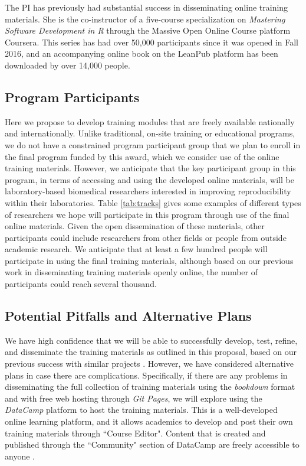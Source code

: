 \documentclass[pdftex,english,11.5pt,parskip=half]{scrartcl}
\begin{document}
The PI has previously had substantial success in disseminating online training materials. She is the co-instructor of a five-course specialization on \textit{Mastering Software Development in R} through the Massive Open Online Course platform Coursera. This series has had over 50,000 participants since it was opened in Fall 2016, and an accompanying online book on the LeanPub platform has been downloaded by over 14,000 people.

\subsection{Program Participants}

Here we propose to develop training modules that are freely available nationally and internationally. Unlike traditional, on-site training or educational programs, we do not have a constrained program participant group that we plan to enroll in the final program funded by this award, which we consider use of the online training materials. However, we anticipate that the key participant group in this program, in terms of accessing and using the developed online materials, will be laboratory-based biomedical researchers interested in improving reproducibility within their laboratories. Table \ref*{tab:tracks} gives some examples of different types of researchers we hope will participate in this program through use of the final online materials. Given the open dissemination of these materials, other participants could include researchers from other fields or people from outside academic research. We anticipate that at least a few hundred people will participate in using the final training materials, although based on our previous work in disseminating training materials openly online, the number of participants could reach several thousand.

\subsection{Potential Pitfalls and Alternative Plans}

We have high confidence that we will be able to successfully develop, test, refine, and disseminate the training materials as outlined in this proposal, based on our previous success with similar projects \cite{andersonmastering, andersoncoursebook}. However, we have considered alternative plans in case there are complications. Specifically, if there are any problems in disseminating the full collection of training materials using the \textit{bookdown} format and with free web hosting through \textit{Git Pages}, we will explore using the \textit{DataCamp} platform \cite{datacamp} to host the training materials. This is a well-developed online learning platform, and it allows academics to develop and post their own training materials through ``Course Editor". Content that is created and published through the ``Community" section of DataCamp are freely accessible to anyone \cite{authoringdatacamp}.  
\end{document}
